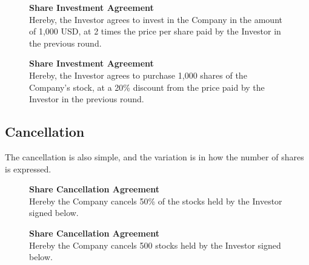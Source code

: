 \begin{multicols}{2}
	\begin{figure}[H]\label{fig:doc-tt-issuance-3}
		\centering
		\begin{minipage}{0.4\textwidth}
			\textbf{Share Investment Agreement}
			\\
			Hereby, the Investor agrees to invest in the Company in the amount of 1,000 USD, at 2 times the price per share paid by the Investor in the previous round.
		\end{minipage}
	\end{figure}
	\columnbreak{}
	\begin{figure}[H]\label{fig:doc-tt-issuance-4}
		\centering
		\begin{minipage}{0.4\textwidth}
			\textbf{Share Investment Agreement}
			\\
			Hereby, the Investor agrees to purchase 1,000 shares of the Company's stock, at a 20\% discount from the price paid by the Investor in the previous round.
		\end{minipage}
	\end{figure}
\end{multicols}

\subsection{Cancellation}

The cancellation is also simple, and the variation is in how the number of shares is expressed.

\begin{multicols}{2}
	\begin{figure}[H]\label{fig:doc-tt-cancellation}
		\centering
		\begin{minipage}{0.4\textwidth}
			\textbf{Share Cancellation Agreement}
			\\
			Hereby the Company cancels 50\% of the stocks held by the Investor signed below.
		\end{minipage}
	\end{figure}
	\columnbreak{}
	\begin{figure}[H]\label{fig:doc-tt-cancellation-2}
		\centering
		\begin{minipage}{0.4\textwidth}
			\textbf{Share Cancellation Agreement}
			\\
			Hereby the Company cancels 500 stocks held by the Investor signed below.
		\end{minipage}
	\end{figure}
\end{multicols}

